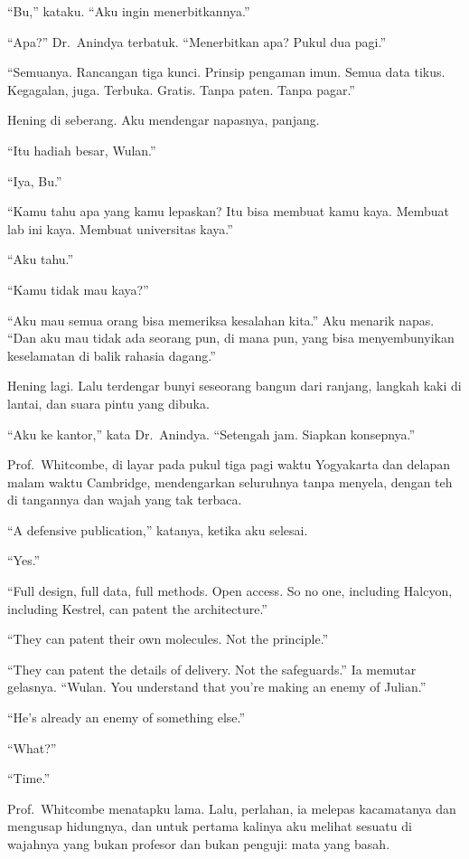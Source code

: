 \documentclass[11pt,twoside,openany]{book}
\makeatletter
\newcommand{\scenebreak}{\par\vspace{0.9em}{\centering\textsc{*\hspace{0.7em}*\hspace{0.7em}*}\par}\vspace{0.9em}\@afterindentfalse\@afterheading}
\makeatother
\begin{document}
``Bu,'' kataku. ``Aku ingin menerbitkannya.''

``Apa?'' Dr.~Anindya terbatuk. ``Menerbitkan apa? Pukul dua pagi.''

``Semuanya. Rancangan tiga kunci. Prinsip pengaman imun. Semua data tikus. Kegagalan, juga. Terbuka. Gratis. Tanpa paten. Tanpa pagar.''

Hening di seberang. Aku mendengar napasnya, panjang.

``Itu hadiah besar, Wulan.''

``Iya, Bu.''

``Kamu tahu apa yang kamu lepaskan? Itu bisa membuat kamu kaya. Membuat lab ini kaya. Membuat universitas kaya.''

``Aku tahu.''

``Kamu tidak mau kaya?''

``Aku mau semua orang bisa memeriksa kesalahan kita.'' Aku menarik napas. ``Dan aku mau tidak ada seorang pun, di mana pun, yang bisa menyembunyikan keselamatan di balik rahasia dagang.''

Hening lagi. Lalu terdengar bunyi seseorang bangun dari ranjang, langkah kaki di lantai, dan suara pintu yang dibuka.

``Aku ke kantor,'' kata Dr.~Anindya. ``Setengah jam. Siapkan konsepnya.''

\scenebreak
Prof.~Whitcombe, di layar pada pukul tiga pagi waktu Yogyakarta dan delapan malam waktu Cambridge, mendengarkan seluruhnya tanpa menyela, dengan teh di tangannya dan wajah yang tak terbaca.

``A defensive publication,'' katanya, ketika aku selesai.

``Yes.''

``Full design, full data, full methods. Open access. So no one, including Halcyon, including Kestrel, can patent the architecture.''

``They can patent their own molecules. Not the principle.''

``They can patent the details of delivery. Not the safeguards.'' Ia memutar gelasnya. ``Wulan. You understand that you're making an enemy of Julian.''

``He's already an enemy of something else.''

``What?''

``Time.''

Prof.~Whitcombe menatapku lama. Lalu, perlahan, ia melepas kacamatanya dan mengusap hidungnya, dan untuk pertama kalinya aku melihat sesuatu di wajahnya yang bukan profesor dan bukan penguji: mata yang basah.
\end{document}
